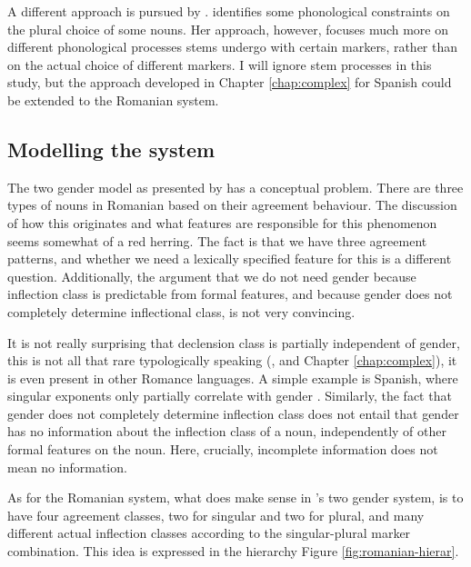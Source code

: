 A different approach is pursued by \textcite{Steriade.2008}. \citeauthor{Steriade.2008} identifies some phonological constraints on the plural choice of some nouns. Her approach, however, focuses much more on different phonological processes stems undergo with certain markers, rather than on the actual choice of different markers. I will ignore stem processes in this study, but the approach developed in Chapter \ref{chap:complex} for Spanish could be extended to the Romanian system.

\subsection{Modelling the system}

The two gender model as presented by \textcite{Bateman.2010} has a conceptual problem. There are three types of nouns in Romanian based on their agreement behaviour. The discussion of how this originates and what features are responsible for this phenomenon seems somewhat of a red herring. The fact is that we have three agreement patterns, and whether we need a lexically specified feature for this is a different question. Additionally, the argument that we do not need gender because inflection class is predictable from formal features, and because gender does not completely determine inflectional class, is not very convincing.

It is not really surprising that declension class is partially independent of gender, this is not all that rare typologically speaking (\cite{Corbett.1991}, and Chapter \ref{chap:complex}), it is even present in other Romance languages. A simple example is Spanish, where singular exponents only partially correlate with gender \autocite{Harris.1991}. Similarly, the fact that gender does not completely determine inflection class does not entail that gender has no information about the inflection class of a noun, independently of other formal features on the noun. Here, crucially, incomplete information does not mean no information.

As for the Romanian system, what does make sense in \textcite{Bateman.2010}'s two gender system, is to have four agreement classes, two for singular and two for plural, and many different actual inflection classes according to the singular-plural marker combination. This idea is expressed in the hierarchy Figure \ref{fig:romanian-hierar}.

